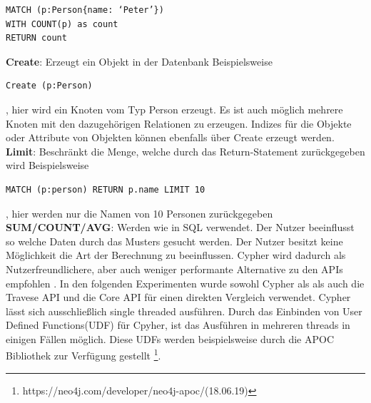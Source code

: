 \begin{Verbatim}[frame=single]
MATCH (p:Person{name: ‘Peter’})  
WITH COUNT(p) as count  
RETURN count
\end{Verbatim} 
\textbf{Create}: Erzeugt ein Objekt in der Datenbank Beispielsweise 
\begin{Verbatim}[frame=single]
Create (p:Person)
\end{Verbatim}
, hier wird ein Knoten vom Typ Person erzeugt. Es ist auch möglich mehrere Knoten mit den dazugehörigen Relationen zu erzeugen. Indizes  für die Objekte oder Attribute von Objekten können ebenfalls über Create erzeugt werden.\newline
\textbf{Limit}: Beschränkt die Menge, welche durch das Return-Statement zurückgegeben wird Beispielsweise
\begin{Verbatim}[frame=single]
MATCH (p:person) RETURN p.name LIMIT 10
\end{Verbatim} 
, hier werden nur die Namen  von 10 Personen zurückgegeben\newline
\textbf{SUM/COUNT/AVG}: Werden wie in SQL verwendet. \newline
Der Nutzer beeinflusst so welche Daten durch  das Musters gesucht werden. Der Nutzer besitzt keine Möglichkeit die Art der Berechnung zu beeinflussen. Cypher wird dadurch als Nutzerfreundlichere, aber auch weniger performante Alternative zu den APIs empfohlen \parencite{vukotic2015neo4j}. In den folgenden Experimenten wurde sowohl Cypher als als auch die Travese API und die Core API für einen direkten Vergleich verwendet. Cypher lässt sich ausschließlich  single threaded ausführen. Durch das Einbinden von User Defined Functions(UDF) für Cpyher, ist das Ausführen in mehreren threads in einigen Fällen möglich. Diese UDFs werden beispielsweise durch die APOC Bibliothek zur Verfügung gestellt \footnote{https://neo4j.com/developer/neo4j-apoc/(18.06.19)}.

